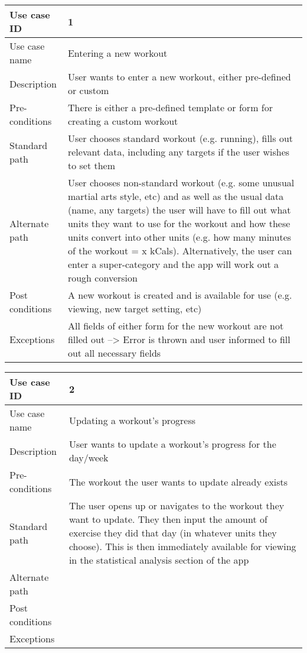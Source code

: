 \documentclass{article}
\begin{document}
\begin{tabular}{ | l || p{10cm} | }
	
	\hline
	Use case ID & 1 \\ \hline
	Use case name & Entering a new workout \\ \hline
	Description & User wants to enter a new workout, either pre-defined or custom \\ \hline
	Pre-conditions & There is either a pre-defined template or form for creating a custom workout \\ \hline
	Standard path & User chooses standard workout (e.g. running), fills out relevant data, including any targets if the user wishes to set them \\ \hline
	Alternate path & User chooses non-standard workout (e.g. some unusual martial arts style, etc) and as well as the usual data (name, any targets) the user will
	have to fill out what units they want to use for the workout and how these units convert into other units (e.g. how many minutes of the workout = x kCals).
	Alternatively, the user can enter a super-category and the app will work out a rough conversion \\ \hline
	Post conditions & A new workout is created and is available for use (e.g. viewing, new target setting, etc) \\ \hline
	Exceptions & All fields of either form for the new workout are not filled out --> Error is thrown and user informed to fill out all necessary fields \\ \hline

\end{tabular}

\begin{tabular}{ | l || p{10cm} | }
	
	\hline
	Use case ID & 2 \\ \hline
	Use case name & Updating a workout's progress \\ \hline
	Description & User wants to update a workout's progress for the day/week \\ \hline
	Pre-conditions &  The workout the user wants to update already exists \\ \hline
	Standard path & The user opens up or navigates to the workout they want to update. They then input the amount of exercise they did that day (in whatever units they choose). This is then immediately available for viewing in the statistical analysis section of the app \\ \hline
	Alternate path &  \\ \hline
	Post conditions &  \\ \hline
	Exceptions &  \\ \hline

\end{tabular}
\end{document}
